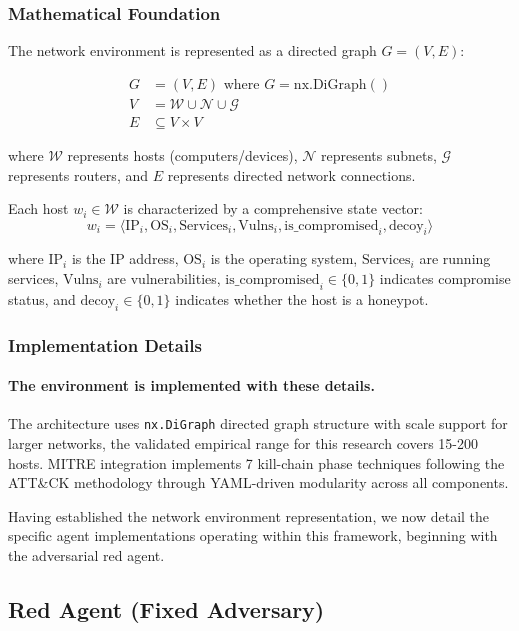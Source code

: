 \documentclass[12pt,oneside]{article}
\begin{document}
\subsubsection{Mathematical Foundation}
The network environment is represented as a directed graph $G = (V, E)$:

\begin{align}
G &= (V, E) \text{ where } G = \text{nx.DiGraph}() \\
V &= \mathcal{W} \cup \mathcal{N} \cup \mathcal{G} \\
E &\subseteq V \times V
\end{align}

where $\mathcal{W}$ represents hosts (computers/devices), $\mathcal{N}$ represents subnets, $\mathcal{G}$ represents routers, and $E$ represents directed network connections.

Each host $w_i \in \mathcal{W}$ is characterized by a comprehensive state vector:
\begin{equation}
w_i = \langle \text{IP}_i, \text{OS}_i, \text{Services}_i, \text{Vulns}_i, \text{is\_compromised}_i, \text{decoy}_i \rangle
\end{equation}

where $\text{IP}_i$ is the IP address, $\text{OS}_i$ is the operating system, $\text{Services}_i$ are running services, $\text{Vulns}_i$ are vulnerabilities, $\text{is\_compromised}_i \in \{0,1\}$ indicates compromise status, and $\text{decoy}_i \in \{0,1\}$ indicates whether the host is a honeypot.

\subsubsection{Implementation Details}
\paragraph{The environment is implemented with these details.}The architecture uses \texttt{nx.DiGraph} directed graph structure with scale support for larger networks, the validated empirical range for this research covers 15-200 hosts. MITRE integration implements 7 kill-chain phase techniques following the ATT\&CK methodology through YAML-driven modularity across all components.

Having established the network environment representation, we now detail the specific agent implementations operating within this framework, beginning with the adversarial red agent.

\subsection{Red Agent (Fixed Adversary)}
\end{document}
